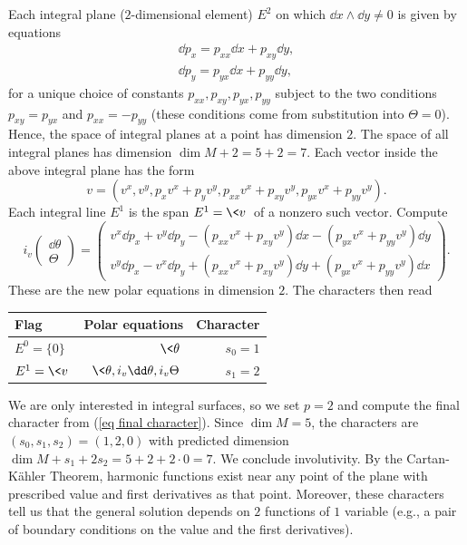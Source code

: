 \begin{example}
    Each integral plane ($2$-dimensional element) $E^2$ on which $\dd x\wedge\dd y\neq 0$ is given by equations 
    \begin{align}
        \dd p_x=p_{xx}\dd x+p_{xy}\dd y,\\
        \dd p_y=p_{yx}\dd x+p_{yy}\dd y,
    \end{align}
    for a unique choice of constants $p_{xx},p_{xy},p_{yx},p_{yy}$ subject to the two conditions $p_{xy}=p_{yx}$ and $p_{xx}=-p_{yy}$ (these conditions come from substitution into $\Theta=0$). Hence, the space of integral planes at a point has dimension $2$. The space of all integral planes has dimension $\dim M+2=5+2=7$. Each vector inside the above integral plane has the form 
    \[v=\left(v^x,v^y,p_xv^x+p_yv^y,p_{xx}v^x+p_{xy}v^y,p_{yx}v^x+p_{yy}v^y\right).\]
    Each integral line $E^1$ is the span $E^1=\<v\>$ of a nonzero such vector. Compute 
    \[i_v \begin{pmatrix}
        \dd \theta \\
        \Theta
    \end{pmatrix}=
    \begin{pmatrix}
        v^x \dd p_x+v^y\dd p_y-(p_{xx}v^x+p_{xy}v^y)\dd x-(p_{yx}v^x+p_{yy}v^y)\dd y\\
        v^y\dd p_x-v^x\dd p_y+(p_{xx}v^x+p_{xy}v^y)\dd y+(p_{yx}v^x+p_{yy}v^y)\dd x
    \end{pmatrix}.
    \]
   These are the new polar equations in dimension $2$. The characters then read 
    \begin{center}
        \begin{tabular}{l r r} 
         Flag & Polar equations & Character \\ [0.5ex] 
         \hline
         $E^0=\{0\}$ & $\<\theta\>$ & $s_0=1$ \\ 
         $E^1=\<v\>$ & $\<\theta,i_v\dd\theta,i_v\Theta\>$ & $s_1=2$ \\
         \hline
        \end{tabular}
    \end{center}
    We are only interested in integral surfaces, so we set $p=2$ and compute the final character from (\ref{eq final character}). Since $\dim M=5$, the characters are $(s_0,s_1,s_2)=(1,2,0)$ with predicted dimension $\dim M+s_1+2s_2=5+2+2\cdot 0=7$. We conclude involutivity. By the Cartan-K\"ahler Theorem, harmonic functions exist near any point of the plane with prescribed value and first derivatives as that point. Moreover, these characters tell us that the general solution depends on $2$ functions of $1$ variable (e.g., a pair of boundary conditions on the value and the first derivatives).
\end{example}

